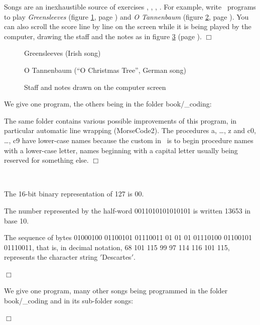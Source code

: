 \begin{exercice}{Songs are an inexhaustible source of exercises
 \cite{boutet}, \cite{sabatier1}, \cite{sabatier2}, \cite{sabatier3}.
 For example, write
\python\ programs to play {\em Green\-sleeves\/} (figure \ref{fig:Greensleeves}, page \pageref{fig:Greensleeves})
and {\em O Tannenbaum\/} (figure \ref{fig:Tannenbaum}, page \pageref{fig:Tannenbaum}).
You can also scroll the score line by line on the screen
while it is being played by the computer, drawing the staff
and the notes as in figure \ref{fig:RepNotes} (page \pageref{fig:RepNotes}).
\noindent $\Box$}\end{exercice}
\begin{figure}[htbp]
 
 \caption{Greensleeves (Irish song)}\label{fig:Greensleeves}
\end{figure}
\begin{figure}[htbp]
 
 \caption{O Tannenbaum (``O Christmas Tree'', German song)}\label{fig:Tannenbaum}
\end{figure}
\begin{figure}[htbp]
 \caption{Staff and notes drawn on the computer screen}\label{fig:RepNotes}
\end{figure}
\begin{corrige}{
We give one program, the others being in the folder {\idt book/\_coding}:


The same folder contains various possible improvements of this program, in particular
automatic line wrapping ({\idt MorseCode2}).
The procedures {\idt a}, \ldots, {\idt z} and {\idt c0}, \ldots, {\idt c9} have
lower-case names because the custom in \python\ is to begin procedure names with a lower-case letter,
names beginning with a capital letter usually being reserved for something else.
\noindent $\Box$}\end{corrige}
\begin{corriges}{\ \\
\vspace{-\baselineskip}

\tiret The 16-bit binary representation of 127 is
00.

\tiret The number represented by the half-word 0011010101010101 is written
13653 in base 10.

\tiret The sequence of bytes 01000100 01100101 01110011 01 01
01 01110100 01100101 01110011,
that is, in decimal notation, 68 101 115 99 97 114 116 101 115,
represents the character string
{\cha $\scriptstyle '$Descartes\idt $\scriptstyle '$}.

\noindent $\Box$}\end{corriges}
\begin{corrige}{
We give one program, many other songs being programmed in the folder
{\idt book/\_coding} and in its sub-folder {\idt songs}:

\noindent $\Box$}\end{corrige}

